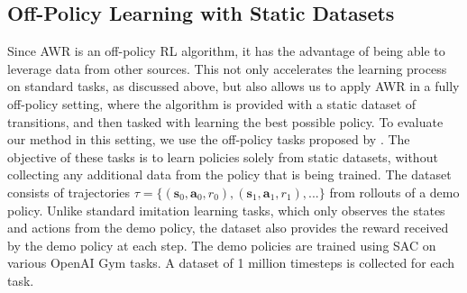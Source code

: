\subsection{Off-Policy Learning with Static Datasets}

Since AWR is an off-policy RL algorithm, it has the advantage of being able to leverage data from other sources. This not only accelerates the learning process on standard tasks, as discussed above, but also allows us to apply AWR in a fully off-policy setting, where the algorithm is provided with a static dataset of transitions, and then tasked with learning the best possible policy. To evaluate our method in this setting, we use the off-policy tasks proposed by \citet{BEAR2019}. The objective of these tasks is to learn policies solely from static datasets, without collecting any additional data from the policy that is being trained. The dataset consists of trajectories $\tau = \{\left({\mathbf{s}}_0, {\mathbf{a}}_0, r_0 \right), \left({\mathbf{s}}_1, {\mathbf{a}}_1, r_1 \right), ... \}$ from rollouts of a demo policy. Unlike standard imitation learning tasks, which only observes the states and actions from the demo policy, the dataset also provides the reward received by the demo policy at each step. The demo policies are trained using SAC on various OpenAI Gym tasks. A dataset of 1 million timesteps is collected for each task. 

